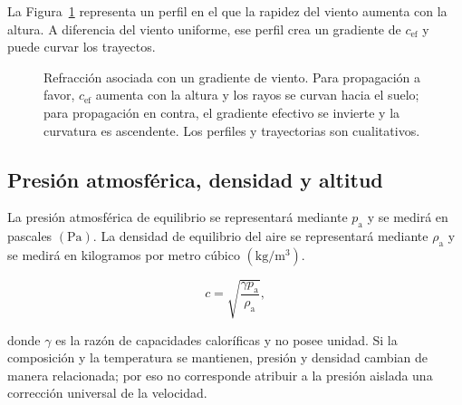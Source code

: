 
La Figura~\ref{fig:u9-gradiente-viento} representa un perfil en el que la
rapidez del viento aumenta con la altura. A diferencia del viento uniforme,
ese perfil crea un gradiente de \(c_\mathrm{ef}\) y puede curvar los
trayectos.

\begin{figure}[htbp]
    \centering
    
    \caption{Refracción asociada con un gradiente de viento. Para propagación
    a favor, \(c_\mathrm{ef}\) aumenta con la altura y los rayos se curvan
    hacia el suelo; para propagación en contra, el gradiente efectivo se
    invierte y la curvatura es ascendente. Los perfiles y trayectorias son
    cualitativos.}
    \label{fig:u9-gradiente-viento}
\end{figure}

\subsection{Presión atmosférica, densidad y altitud}
\label{sec:u9-presion-altitud}

La presión atmosférica de equilibrio se representará mediante \(p_\mathrm{a}\)
y se medirá en pascales \((\text{Pa})\). La densidad de equilibrio del aire se
representará mediante \(\rho_\mathrm{a}\) y se medirá en kilogramos por metro
cúbico \((\text{kg}/\text{m}^3)\).


\begin{equation}
    c=\sqrt{\frac{\gamma p_\mathrm{a}}{\rho_\mathrm{a}}},
    \label{eq:u9-velocidad-presion-densidad}
\end{equation}

donde \(\gamma\) es la razón de capacidades caloríficas y no posee unidad. Si
la composición y la temperatura se mantienen, presión y densidad cambian de
manera relacionada; por eso no corresponde atribuir a la presión aislada una
corrección universal de la velocidad.


